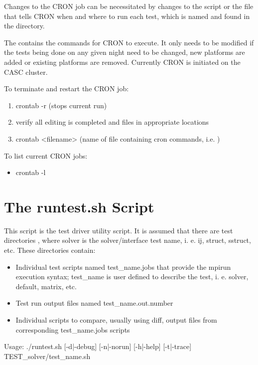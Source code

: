 Changes to the CRON job can be necessitated by changes to the  script or the
file that tells CRON when and where to run each test, which is named  and
found in the  directory.

The  contains the commands for CRON to execute.  It only needs to be modified
if the tests being done on any given night need to be changed, new platforms are added or 
existing platforms are removed.  Currently CRON is initiated on the CASC cluster.

To terminate and restart the CRON job:
\begin{enumerate}
\item crontab -r          (stops current run)
\item verify all editing is completed and files in appropriate locations
\item crontab <filename>  (name of file containing cron commands, i.e. )
\end{enumerate}

To list current CRON jobs:
\begin{itemize}
\item crontab -l 
\end{itemize}

\section{The runtest.sh Script}
\label{The runtest.sh Script}

This script is the test driver utility script.  It is assumed that there are 
test directories , where {solver} is the solver/interface
test name, i. e. ij, struct, sstruct, etc.  These directories contain:
\begin{itemize}
\item Individual test scripts named {test\_name}.jobs that provide the mpirun
execution syntax; {test\_name} is user defined to describe the test, i. e. solver, 
default, matrix, etc.
\item Test run output files named {test\_name}.out.{number}
\item Individual scripts to compare, usually using diff, output files from
corresponding {test\_name}.jobs scripts
\end{itemize}

Usage:
./runtest.sh [-d|-debug] [-n|-norun] [-h|-help] [-t|-trace] TEST\_{solver}/{test\_name}.sh


